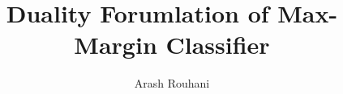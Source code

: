 \documentclass[a4paper,11pt]{article}
\title{Duality Forumlation of Max-Margin Classifier}
\author{Arash Rouhani}
\begin{document}
\maketitle
\tableofcontents

\begin{abstract}
\end{abstract}

\section{}
\end{document}
